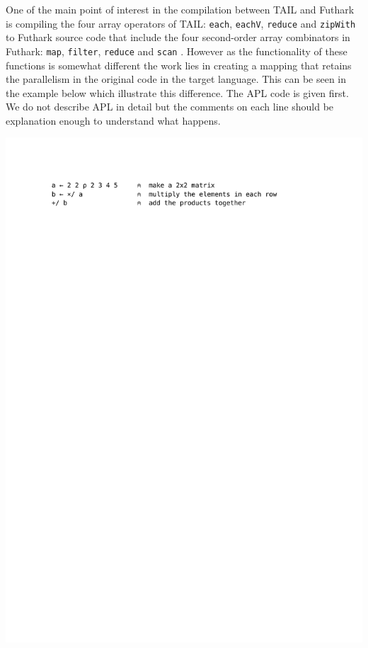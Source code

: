 \documentclass[11pt]{article}
\begin{document}
One of the main point of interest in the compilation between TAIL and Futhark is compiling the four array operators 
of TAIL: {\tt each}, {\tt eachV}, 
 {\tt reduce} and {\tt zipWith} to Futhark source code that include the four second-order array combinators in Futhark:  
 {\tt map}, {\tt filter}, {\tt reduce} and {\tt scan} \cite{ElsmanDybdal:Array:2014}\cite{TroelsHenriksen}. 
However as the functionality of these functions is somewhat different the work lies in creating a mapping that retains the parallelism in the original code in the target language.
This can be seen in the example below which illustrate this difference. 
The APL code is given first. We do not describe APL in detail but the comments on each line should be explanation enough to understand what happens. 
%
%
%

\includegraphics[scale=0.7,trim=6em 72em 10em 6em,clip=true]{reduce}
\end{document}
